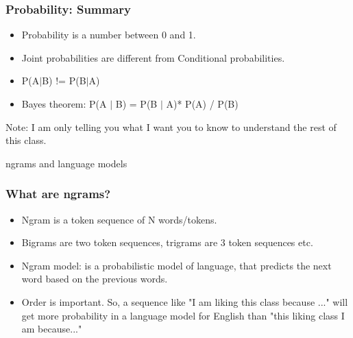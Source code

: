 \documentclass{beamer}
\begin{document}
\begin{frame}
\frametitle{Probability: Summary}
\begin{itemize}
\item Probability is a number between 0 and 1.
\item Joint probabilities are different from Conditional probabilities.
\item P(A$|$B) != P(B$|$A)
\item Bayes theorem: P(A $|$ B) = P(B $|$ A)* P(A) / P(B)
\end{itemize}
Note: I am only telling you what I want you to know to understand the rest of this class.
\end{frame}

\begin{frame}
\begin{center}
\Large ngrams and language models
\end{center}
\end{frame}

\begin{frame}
\frametitle{What are ngrams?}
\begin{itemize}
\item Ngram is a token sequence of N words/tokens.
\item Bigrams are two token sequences, trigrams are 3 token sequences etc.
\item Ngram model: is a probabilistic model of language, that predicts the next word based on the previous words. 
\item Order is important. So, a sequence like "I am liking this class because ..." will get more probability in a language model for English than "this liking class I am because..."
\end{itemize}
\end{frame}
\end{document}
